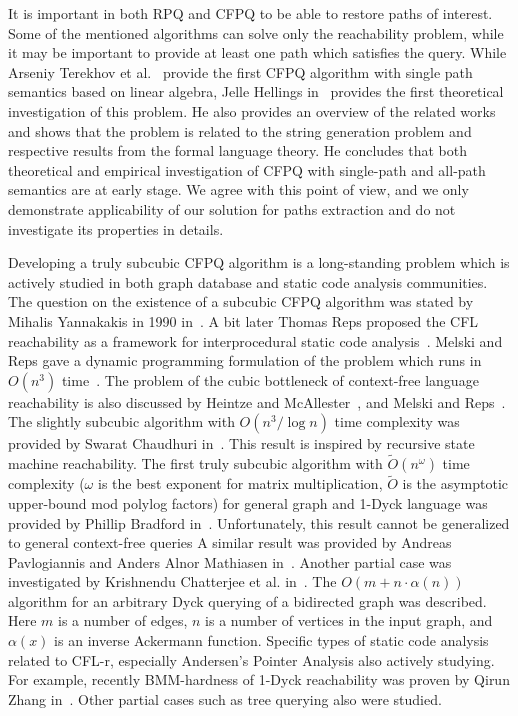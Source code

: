 It is important in both RPQ and CFPQ to be able to restore paths of interest.
Some of the mentioned algorithms can solve only the reachability problem, while it may be important to provide at least one path which satisfies the query.
While Arseniy Terekhov et al.~\cite{10.1145/3398682.3399163} provide the first CFPQ algorithm with single path semantics based on linear algebra, Jelle Hellings in~\cite{HellSinglePath} provides the first theoretical investigation of this problem.
He also provides an overview of the related works and shows that the problem is related to the string generation problem and respective results from the formal language theory.
He concludes that both theoretical and empirical investigation of CFPQ with single-path and all-path semantics are at early stage.
We agree with this point of view, and we only demonstrate applicability of our solution for paths extraction and do not investigate its properties in details.

Developing a truly subcubic CFPQ algorithm is a long-standing problem which is actively studied in both graph database and static code analysis communities.
The question on the existence of a subcubic CFPQ algorithm was stated by Mihalis Yannakakis in 1990 in~\cite{Yannakakis}.
A bit later Thomas Reps proposed the CFL reachability as a framework for interprocedural static code analysis~\cite{10.5555/271338.271343}.
Melski and Reps gave a dynamic programming formulation of the problem which runs in $O(n^3)$ time~\cite{10.1145/258993.259006}.
The problem of the cubic bottleneck of context-free language reachability is also discussed by Heintze and McAllester~\cite{10.5555/788019.788876}, and Melski and Reps~\cite{10.1145/258993.259006}.
The slightly subcubic algorithm with $O(n^3/\log{n})$ time complexity was provided by Swarat Chaudhuri in~\cite{10.1145/1328897.1328460}.
This result is inspired by recursive state machine reachability.
The first truly subcubic algorithm with $\widetilde{O}(n^\omega)$ time complexity ($\omega$ is the best exponent for matrix multiplication, $\widetilde{O}$ is the asymptotic upper-bound mod polylog factors) for general graph and 1-Dyck language was provided by Phillip Bradford in~\cite{Bradford2017EfficientEP}. Unfortunately, this result cannot be generalized to general context-free queries
A similar result was provided by Andreas Pavlogiannis and Anders Alnor Mathiasen in~\cite{pavlogiannis2020finegrained}.
Another partial case was investigated by Krishnendu Chatterjee et al. in~\cite{10.1145/3158118}.
The $O(m + n \cdot \alpha(n))$ algorithm for an arbitrary Dyck querying of a bidirected graph was described. Here $m$ is a number of edges, $n$ is a number of vertices in the input graph, and $\alpha(x)$ is an inverse Ackermann function.
Specific types of static code analysis related to CFL-r, especially Andersen's Pointer Analysis also actively studying.
For example, recently BMM-hardness of 1-Dyck reachability was proven by	Qirun Zhang in~\cite{zhang2020conditional}.
Other partial cases such as tree querying also were studied.

